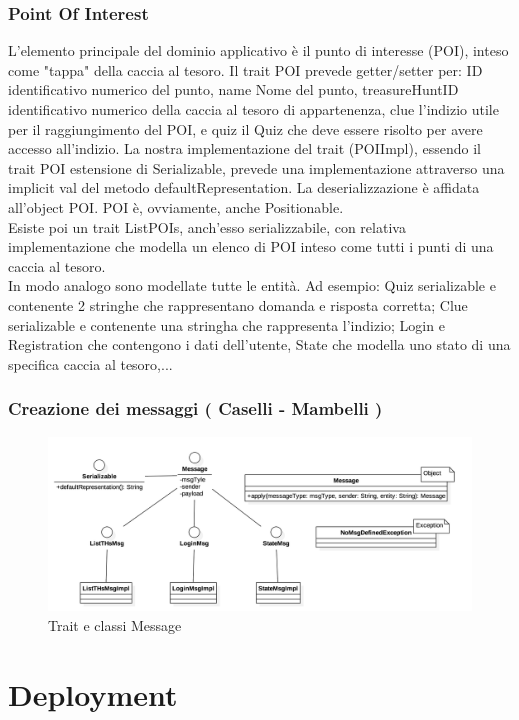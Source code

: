 \documentclass[12pt, italian]{article}
\begin{document}
\subsubsection*{Point Of Interest}
L'elemento principale del dominio applicativo è il punto di interesse (POI), inteso come "tappa" della caccia al tesoro.
Il trait POI prevede getter/setter per: ID identificativo numerico del punto, name Nome del punto, treasureHuntID identificativo numerico della caccia al tesoro di appartenenza, clue l'indizio utile per il raggiungimento del POI, e quiz il Quiz che deve essere risolto per avere accesso all'indizio.
La nostra implementazione del trait (POIImpl), essendo il trait POI estensione di Serializable, prevede una implementazione attraverso una implicit val del metodo defaultRepresentation. La deserializzazione è affidata all'object POI.
POI è, ovviamente, anche Positionable.\\
Esiste poi un trait ListPOIs, anch'esso serializzabile, con relativa implementazione che modella un elenco di POI inteso come tutti i punti di una caccia al tesoro.\\
In modo analogo sono modellate tutte le entità. Ad esempio: Quiz serializable e contenente 2 stringhe che rappresentano domanda e risposta corretta; Clue serializable e contenente una stringha che rappresenta l'indizio; Login e Registration che contengono i dati dell'utente, State che modella uno stato di una specifica caccia al tesoro,...

\subsubsection{Creazione dei messaggi ( Caselli - Mambelli )}

\begin{figure}[H]
	\centering
	\includegraphics[width=1\textwidth]{img/diagram02.png}
	\caption{Trait e classi Message}
\end{figure}

\section{Deployment}
\end{document}
